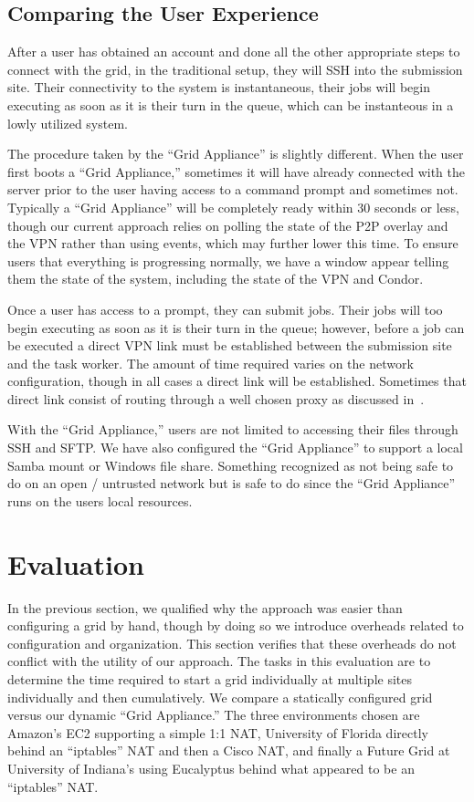 \documentclass[conference]{IEEEtran}
\begin{document}
\subsection{Comparing the User Experience}

After a user has obtained an account and done all the other appropriate steps
to connect with the grid, in the traditional setup, they will SSH into the
submission site.  Their connectivity to the system is instantaneous, their jobs
will begin executing as soon as it is their turn in the queue, which can be
instanteous in a lowly utilized system.

The procedure taken by the ``Grid Appliance'' is slightly different.  When the
user first boots a ``Grid Appliance,'' sometimes it will have already connected
with the server prior to the user having access to a command prompt and
sometimes not.  Typically a ``Grid Appliance'' will be completely ready within
30 seconds or less, though our current approach relies on polling the state of
the P2P overlay and the VPN rather than using events, which may further lower
this time.  To ensure users that everything is progressing normally, we have a
window appear telling them the state of the system, including the state of the
VPN and Condor.

Once a user has access to a prompt, they can submit jobs.  Their jobs will too
begin executing as soon as it is their turn in the queue; however, before a job
can be executed a direct VPN link must be established between the submission
site and the task worker.  The amount of time required varies on the network
configuration, though in all cases a direct link will be established.
Sometimes that direct link consist of routing through a well chosen proxy as
discussed in~\cite{groupvpn}.

With the ``Grid Appliance,'' users are not limited to accessing their files
through SSH and SFTP.  We have also configured the ``Grid Appliance'' to
support a local Samba mount or Windows file share.  Something recognized as not
being safe to do on an open / untrusted network but is safe to do since the
``Grid Appliance'' runs on the users local resources.

\section{Evaluation}
\label{evaluation}

In the previous section, we qualified why the approach was easier than
configuring a grid by hand, though by doing so we introduce overheads related
to configuration and organization.  This section verifies that these overheads
do not conflict with the utility of our approach.  The tasks in this evaluation
are to determine the time required to start a grid individually at multiple
sites individually and then cumulatively.  We compare a statically configured
grid versus our dynamic ``Grid Appliance.''  The three environments chosen are
Amazon's EC2 supporting a simple 1:1 NAT, University of Florida directly behind
an ``iptables'' NAT and then a Cisco NAT, and finally a Future Grid at
University of Indiana's using Eucalyptus behind what appeared to be an
``iptables'' NAT.
\end{document}
